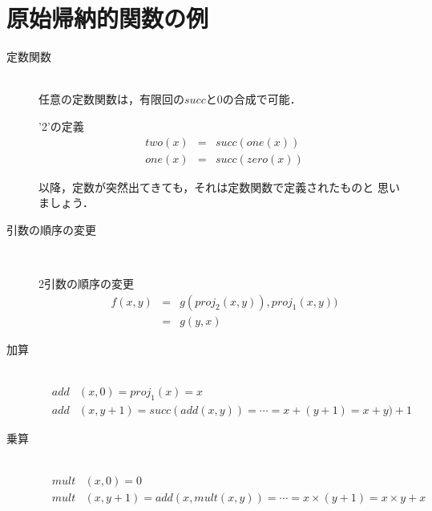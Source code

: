 \section{原始帰納的関数の例} \label{sec:06原始関数の例}
\begin{description}
 \item[定数関数] \mbox{} \\
            任意の定数関数は，有限回の$succ$と$0$の合成で可能．
            \begin{myexample}{'2'の定義}
             \begin{eqnarray*}
              two(x) &=& succ(one(x)) \\
              one(x) &=& succ(zero(x))
             \end{eqnarray*}
            \end{myexample}
            以降，定数が突然出てきても，それは定数関数で定義されたものと
            思いましょう．

 \item[引数の順序の変更] \mbox{} \\
            \begin{myexample}{2引数の順序の変更}
             \begin{eqnarray*}
              f(x, y) &=& g(proj_2(x, y)), proj_1(x, y)) \\
              &=& g(y, x)
             \end{eqnarray*}
            \end{myexample}

 \item[加算] \mbox{} \\
            \begin{eqnarray*}
             &add&(x, 0) = proj_1(x) = x \\
             &add&(x, y+1) = succ (add(x, y)) = \cdots = x + (y + 1) = x
              + y ) + 1
            \end{eqnarray*}

 \item[乗算] \mbox{} \\
            \begin{eqnarray*}
             &mult&(x, 0) = 0 \\
             &mult&(x, y+1) = add(x, mult(x, y)) = \cdots = x \times
              (y+1) = x \times y + x
            \end{eqnarray*}


\end{description}
